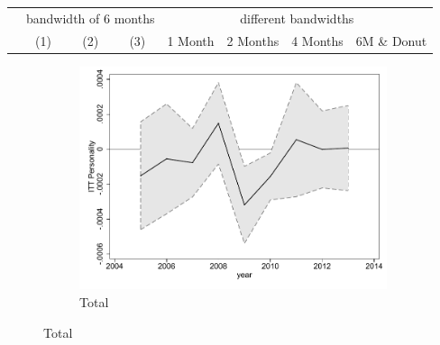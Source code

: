 \documentclass[a4paper ]{article}
\begin{document}
\begin{table}[h]\centering
\def\sym#1{\ifmmode^{#1}\else\(^{#1}\)\fi}
\begin{tabular}{l*{3}{c}|cccc}
\toprule
&\multicolumn{3}{c}{bandwidth of 6 months} & \multicolumn{4}{c}{different bandwidths} \\
 \cmidrule(lr{1em}){2-4} \cmidrule(lr{1em}){5-8}
 &\multicolumn{1}{c}{(1)}&\multicolumn{1}{c}{(2)}&\multicolumn{1}{c}{(3)}& 1 Month & 2 Months & 4 Months & 6M \& Donut \\
\midrule 

\bottomrule
\end{tabular}
\end{table}

\begin{figure}[h!]
	\centering
	\begin{subfigure}[t]{0.5\textwidth}
		\centering
		\includegraphics[width=0.99\textwidth]{R1_LC_Personality}
		\caption{Total}		
	\end{subfigure}
\end{figure}
\end{document}
